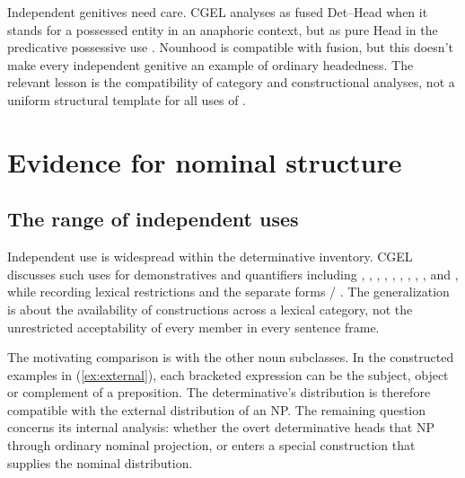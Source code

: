 \documentclass[12pt]{article}
\begin{document}
Independent genitives need care. CGEL analyses  as fused Det--Head when it stands for a possessed entity in an anaphoric context, but as pure Head in the predicative possessive use  \citep[410--411]{huddleston2002}. Nounhood is compatible with fusion, but this doesn't make every independent genitive an example of ordinary headedness. The relevant lesson is the compatibility of category and constructional analyses, not a uniform structural template for all uses of .

\section{Evidence for nominal structure}\label{sec:evidence}

\subsection{The range of independent uses}

Independent use is widespread within the determinative inventory. CGEL discusses such uses for demonstratives and quantifiers including , , , , , , , , ,  and , while recording lexical restrictions and the separate forms / \citep[371--372, 410--424]{huddleston2002}. The generalization is about the availability of constructions across a lexical category, not the unrestricted acceptability of every member in every sentence frame.

The motivating comparison is with the other noun subclasses. In the constructed examples in (\ref{ex:external}), each bracketed expression can be the subject, object or complement of a preposition. The determinative's distribution is therefore compatible with the external distribution of an NP. The remaining question concerns its internal analysis: whether the overt determinative heads that NP through ordinary nominal projection, or enters a special construction that supplies the nominal distribution.

\ea\label{ex:external}
\ea {}\qquad {}\qquad {}
\ex {}\qquad {}\qquad {}
\ex {}\qquad {}\qquad {}
\ex {}\qquad {}\qquad {}
\z\z
\end{document}
